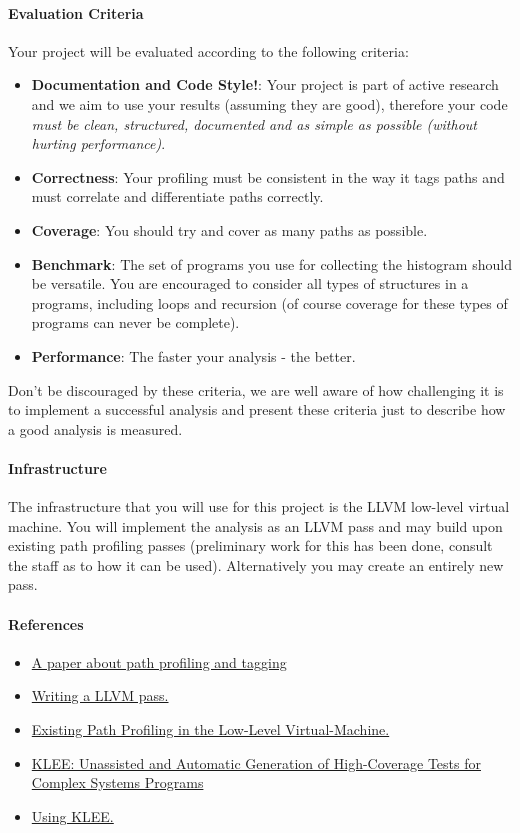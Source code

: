 \documentclass[english]{article}
\begin{document}
\paragraph{Evaluation Criteria}
Your project will be evaluated according to the following criteria:
\begin{itemize}
\item \textbf{Documentation and Code Style!}: Your project is part of active research and we aim to use your results (assuming they are good), therefore your code \emph{must be clean, structured, documented and as simple as possible (without hurting performance)}.
\item \textbf{Correctness}: Your profiling must be consistent in the way it tags paths and must correlate and differentiate paths correctly.
\item \textbf{Coverage}: You should try and cover as many paths as possible.
\item \textbf{Benchmark}: The set of programs you use for collecting the histogram should be versatile. You are encouraged to consider all types of structures in a programs, including loops and recursion (of course coverage for these types of programs can never be complete).
\item \textbf{Performance}: The faster your analysis - the better.
\end{itemize}
Don't be discouraged by these criteria, we are well aware of how challenging it is to implement a successful analysis and present these criteria just to describe how a good analysis is measured.
\paragraph{Infrastructure} The infrastructure that you will use for this project is the LLVM low-level virtual machine. You will implement the analysis as an LLVM pass and may build upon existing path profiling passes (preliminary work for this has been done, consult the staff as to how it can be used). Alternatively you may create an entirely new pass.
\paragraph{References}
\begin{itemize}
\item \href{}{A paper about path profiling and tagging}
\item \href{http://llvm.org/docs/WritingAnLLVMPass.html}{Writing a LLVM pass.}
\item \href{http://llvm.org/pubs/2010-12-Preuss-PathProfiling.html}{Existing Path Profiling in the Low-Level Virtual-Machine.}
\item \href{http://llvm.org/pubs/2008-12-OSDI-KLEE.html} {KLEE: Unassisted and Automatic Generation of High-Coverage Tests for Complex Systems Programs}
\item \href{http://klee.llvm.org/GetStarted.html} {Using KLEE.}
\end{itemize}
\end{document}
